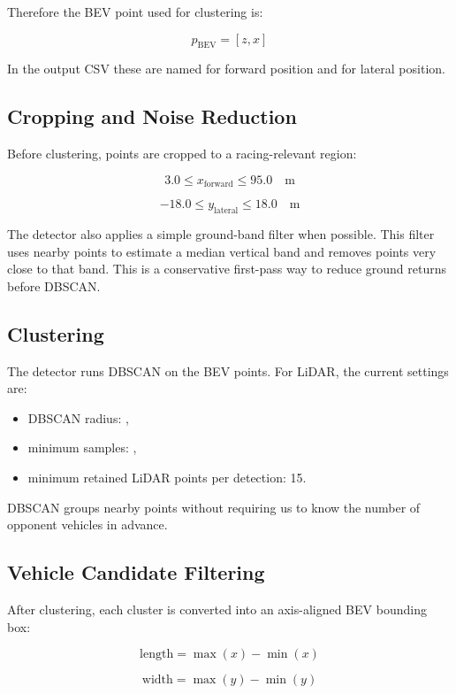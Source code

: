 \documentclass[11pt,a4paper]{article}
\begin{document}
Therefore the BEV point used for clustering is:

\[
  p_{\mathrm{BEV}} = \left[z, x\right]
\]

In the output CSV these are named  for forward position and
 for lateral position.

\subsection{Cropping and Noise Reduction}

Before clustering, points are cropped to a racing-relevant region:

\[
  3.0 \leq x_{\mathrm{forward}} \leq 95.0 \quad\mathrm{m}
\]

\[
  -18.0 \leq y_{\mathrm{lateral}} \leq 18.0 \quad\mathrm{m}
\]

The detector also applies a simple ground-band filter when possible. This filter
uses nearby points to estimate a median vertical band and removes points very
close to that band. This is a conservative first-pass way to reduce ground
returns before DBSCAN.

\subsection{Clustering}

The detector runs DBSCAN on the BEV points. For LiDAR, the current settings are:

\begin{itemize}
  \item DBSCAN radius: ,
  \item minimum samples: ,
  \item minimum retained LiDAR points per detection: 15.
\end{itemize}

DBSCAN groups nearby points without requiring us to know the number of opponent
vehicles in advance.

\subsection{Vehicle Candidate Filtering}

After clustering, each cluster is converted into an axis-aligned BEV bounding
box:

\[
  \mathrm{length} = \max(x) - \min(x)
\]

\[
  \mathrm{width} = \max(y) - \min(y)
\]
\end{document}
